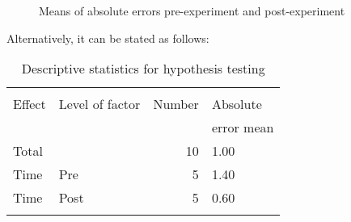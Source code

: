 \documentclass[output=paper]{langsci/langscibook}
\begin{document}
\begin{figure}
\caption{Means of absolute errors pre-experiment and post-experiment}
\end{figure}

Alternatively, it can be stated as follows: 

\begin{table}
\begin{tabular}{llrl}
\lsptoprule
\multicolumn{4}{c}{Descriptive statistics}\\\cmidrule(lr){1-4}
Effect & Level of factor & Number & Absolute\\
		&				&		  & error mean\\\midrule
Total &  & 10 & 1.00\\
Time & Pre & 5 & 1.40\\
Time & Post & 5 & 0.60\\
\lspbottomrule
\end{tabular}
\caption{\label{tab:deysel:4}Descriptive statistics for hypothesis testing}
\end{table}

\begin{table}
\caption{\label{tab:deysel:5}Experimental group ratings pre- and post-experiment}
\end{table}
\end{document}
